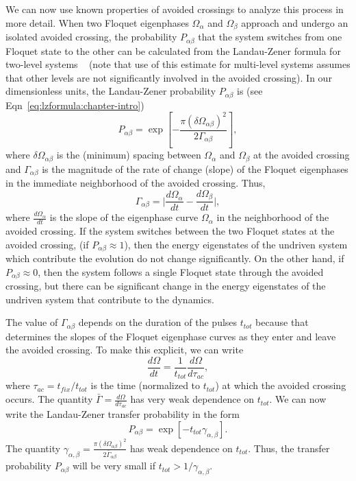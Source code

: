 We can now use known properties of avoided crossings to analyze this process in more detail. 
When two Floquet eigenphases $\Omega_\alpha$ and $\Omega_\beta$ approach and undergo an isolated avoided crossing, the probability $P_{\alpha \beta}$ that  the system switches from one Floquet state to the other   can be calculated from the Landau-Zener formula for two-level systems ~\cite{zener:lzformula} (note that use of this estimate for multi-level systems  assumes that other levels are not significantly involved in the avoided crossing). In our dimensionless units, the Landau-Zener probability $P_{\alpha \beta}$ is (see Eqn~\ref{eq:lzformula:chapter-intro})
%
\begin{equation}
P_{\alpha \beta}=\exp\left[-\frac{\pi ({\delta \Omega_{\alpha \beta}})^2}{2\Gamma_{\alpha \beta}}\right],
\label{eq:landauzener}
\end{equation}
%
where $\delta\Omega_{\alpha\beta}$ is the (minimum) spacing  between $\Omega_\alpha$ and $\Omega_\beta$ at the avoided crossing and $\Gamma_{\alpha\beta}$   is the magnitude of the  rate of change (slope) of the Floquet eigenphases in the immediate neighborhood of the avoided crossing. Thus,
%
\begin{equation}
\Gamma_{\alpha\beta} = {\biggl|} \frac{d\Omega_\alpha}{dt} - \frac{d\Omega_\beta}{dt}{\biggr|},
\label{eq:gamma}
\end{equation}
%
where  $\frac{d\Omega_\alpha}{dt}$ is the slope of the  eigenphase curve $\Omega_\alpha$ in the neighborhood of the avoided crossing. If the system switches between the two Floquet states at the avoided crossing, (if $P_{\alpha \beta}{\approx}1$),  then the energy eigenstates of the undriven system which contribute the evolution do not change significantly.  On the other hand, if $P_{\alpha \beta}{\approx}0$, then the system follows a single Floquet state through the avoided crossing, but there can be significant change in the energy eigenstates of the undriven system that contribute to the dynamics. 

The value of $\Gamma_{\alpha\beta}$ depends on the duration of the pulses $t_{tot}$ because that determines the slopes of the Floquet eigenphase curves as they enter and leave the avoided crossing. To make this explicit, we can write 
%
\begin{equation}
\frac{d{\Omega}}{dt}=\frac{1}{t_{tot}}\frac{d{\Omega}}{d{\tau_{ac}}},
\end{equation}
%
where $\tau_{ac}=t_{fix}/t_{tot}$ is the time (normalized to $t_{tot}$) at which the avoided crossing 
occurs. The quantity ${\bar \Gamma}=\frac{{d\Omega}}{d{\tau}_{ac}}$  has very weak dependence on  $t_{tot}$. We can now write the Landau-Zener transfer probability in the form
%
\begin{equation}
P_{\alpha \beta}=\exp\left[-t_{tot}{\gamma}_{\alpha,\beta} \right].
\label{eq:lanzen}
\end{equation}
%
The quantity ${\gamma}_{\alpha,\beta}=\frac{\pi ({\delta \Omega_{\alpha \beta}})^2}{2{\bar \Gamma}_{\alpha \beta}}$ has  weak dependence on $t_{tot}$. Thus, the transfer probability $P_{\alpha \beta}$ will be very small if $t_{tot}>1/{\gamma}_{\alpha,\beta}$. 

